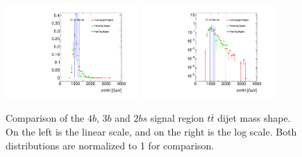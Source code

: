 \begin{figure}[htbp!]
\begin{center}
\includegraphics[width=0.45\textwidth,angle=-90]{figures/boosted/Other/ttbar_compare_mHH_l.pdf}
\includegraphics[width=0.45\textwidth,angle=-90]{figures/boosted/Other/ttbar_compare_mHH_l_1.pdf}
\caption{Comparison of the $4b$, $3b$ and $2bs$ signal region $t\bar{t}$ dijet mass shape. On the left is the linear scale, and on the right is the log scale. Both distributions are normalized to 1 for comparison.}
\label{fig:signal-region-ttbar-compare}
\end{center}
\end{figure}


